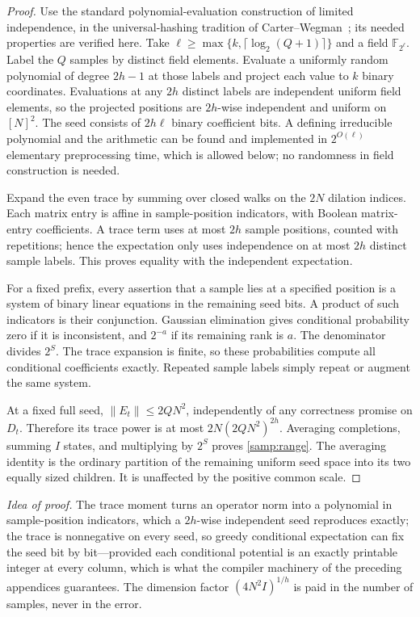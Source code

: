 \documentclass[11pt,letterpaper]{article}
\theoremstyle{definition}
\theoremstyle{remark}
\newcommand{\F}{\mathbb F}
\begin{document}
\begin{proof}
Use the standard polynomial-evaluation construction of limited
independence, in the universal-hashing tradition of
Carter--Wegman~\cite{CarterWegman}; its needed properties are verified
here. Take $\ell\ge\max\{k,\lceil\log_2(Q+1)\rceil\}$ and a field
$\F_{2^\ell}$. Label the $Q$ samples by distinct field elements.
Evaluate a uniformly random polynomial of degree $2h-1$ at those labels
and project each value to $k$ binary coordinates. Evaluations at any
$2h$ distinct labels are independent uniform field elements, so the
projected positions are $2h$-wise independent and uniform on $[N]^2$.
The seed consists of $2h\ell$ binary coefficient bits. A defining
irreducible polynomial and the arithmetic can be found and implemented
in $2^{O(\ell)}$ elementary preprocessing time, which is allowed below;
no randomness in field construction is needed.

Expand the even trace by summing over closed walks on the $2N$ dilation
indices. Each matrix entry is affine in sample-position indicators,
with Boolean matrix-entry coefficients. A trace term uses at most $2h$
sample positions, counted with repetitions; hence the expectation only
uses independence on at most $2h$ distinct sample labels. This proves
equality with the independent expectation.

For a fixed prefix, every assertion that a sample lies at a specified
position is a system of binary linear equations in the remaining seed
bits. A product of such indicators is their conjunction. Gaussian
elimination gives conditional probability zero if it is inconsistent,
and $2^{-a}$ if its remaining rank is $a$. The denominator divides
$2^S$. The trace expansion is finite, so these probabilities compute
all conditional coefficients exactly. Repeated sample labels simply
repeat or augment the same system.

At a fixed full seed, $\|E_t\|\le2QN^2$, independently of any
correctness promise on $D_t$. Therefore its trace power is at most
$2N(2QN^2)^{2h}$. Averaging completions, summing $I$ states, and
multiplying by $2^S$ proves \cref{samp:range}. The averaging identity
is the ordinary partition of the remaining uniform seed space into its
two equally sized children. It is unaffected by the positive common
scale.
\end{proof}

\emph{Idea of proof.} The trace moment turns an operator norm into a
polynomial in sample-position indicators, which a $2h$-wise
independent seed reproduces exactly; the trace is nonnegative on
every seed, so greedy conditional expectation can fix the seed bit by
bit---provided each conditional potential is an exactly printable
integer at every column, which is what the compiler machinery of the
preceding appendices guarantees. The dimension factor $(4N^2I)^{1/h}$
is paid in the number of samples, never in the error.
\end{document}

